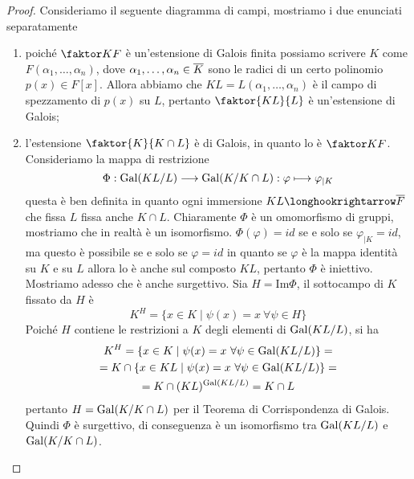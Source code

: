 \documentclass[11pt]{scrartcl}
\begin{document}
\begin{proof}
    Consideriamo il seguente diagramma di campi, mostriamo i due enunciati separatamente
    \begin{center}
    \end{center}
    \begin{enumerate}[(1)]
        \item poiché $\faktor K F$ è un'estensione di Galois finita possiamo scrivere
        $K$ come $F(\alpha_1, \ldots, \alpha_n)$, dove $\alpha_1, \ldots, \alpha_n \in \overline{K}$
        sono le radici di un certo polinomio $p(x) \in F[x]$. Allora abbiamo che
        $KL = L(\alpha_1, \ldots, \alpha_n)$ è il campo di spezzamento di 
        $p(x)$ su $L$, pertanto $\faktor{KL}{L}$ è un'estensione di Galois;
        \item l'estensione $\faktor{K}{K\cap L}$ è di Galois, in quanto lo è $\faktor K F$. Consideriamo la mappa di restrizione
        \[
            \Phi: \operatorname{Gal}(KL/L) \longrightarrow \operatorname{Gal}(K/K\cap L): \varphi\longmapsto \varphi_{\mid K}
        \]
        questa è ben definita in quanto ogni immersione $KL \longhookrightarrow \ol{F}$
        che fissa $L$ fissa anche $K\cap L$. Chiaramente $\Phi$ è un omomorfismo di gruppi, mostriamo che in realtà è un isomorfismo.
        $\Phi(\varphi) = id$ se e solo se $\varphi_{\mid K} = id$, ma questo è possibile se e solo se $\varphi = id$ in quanto se 
        $\varphi$ è la mappa identità su $K$ e su $L$ allora lo è anche sul composto $KL$, pertanto $\Phi$ è iniettivo. Mostriamo adesso
        che è anche surgettivo. Sia $H = \mathrm{Im}\Phi$, il sottocampo di $K$ fissato da $H$ è
        \[
            K^H = \{x \in K \mid \psi(x) = x~\forall \psi \in H\}
        \]
        Poiché $H$ contiene le restrizioni a $K$ degli elementi di $\operatorname{Gal}(KL/L)$, si ha
        \begin{multline*}
            K^H = \{x \in K \mid \psi(x) = x~\forall \psi \in \operatorname{Gal}(KL/L)\} = \\ = K\cap\{x \in KL \mid \psi(x) = x~\forall \psi \in \operatorname{Gal}(KL/L)\} =\\=
            K \cap (KL)^{\operatorname{Gal}(KL/L)} = K\cap L
        \end{multline*}
        pertanto $H = \operatorname{Gal}(K/K\cap L)$ per il Teorema di Corrispondenza di Galois. Quindi $\Phi$ è surgettivo, di conseguenza è un isomorfismo
        tra $\operatorname{Gal}(KL/L)$ e $\operatorname{Gal}(K/K\cap L)$.
    \end{enumerate}
\end{proof}
\end{document}
